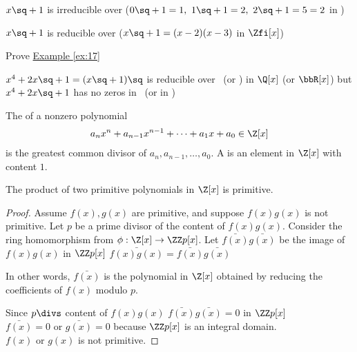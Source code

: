 \documentclass[a4paper]{article}
\begin{document}
\begin{example} \label{ex:17}
  \( x\sq + 1 \) is irreducible over \Zth \qpmi (\( 0\sq+1=1,\ 1\sq+1 = 2,\ 2\sq + 1 = 5 = 2 \) in \Zth)

  \( x\sq + 1 \) is reducible over \Zfi \qpmi (\( x\sq+1 = (x-2)(x-3) \) in \( \Zfi[x] \))
\end{example}

\begin{exercise}
  Prove \hyperref[ex:17]{Example \ref*{ex:17}}
\end{exercise}
\begin{example}
  \( x^4+2x\sq + 1 = (x\sq + 1)\sq \) is reducible over \Q\ (or \bbR) in \( \Q[x] \) (or \( \bbR[x] \)) but \( x^4+2x\sq + 1 \) has no zeros in \Q\ (or in \bbR)
\end{example}

\begin{definition}
The  of a nonzero polynomial \begin{align*}
  a_nx^n + a_{n-1}x^{n-1} + \cdots + a_1x+a_0 \in \Z[x]
\end{align*} is the greatest common divisor of \( a_n, a_{n-1}, \ldots, a_0 \).
A  is an element in \( \Z[x] \) with content \( 1 \).
\end{definition}

\begin{lemma}
  The product of two primitive polynomials in \( \Z[x] \) is primitive.
\end{lemma}

\begin{proof}
  Assume \( f(x),g(x) \) are primitive, and suppose \( f(x)g(x) \) is not primitive.
  Let \( p \) be a prime divisor of the content of \( f(x)g(x) \).
  Consider the ring homomorphism from \( \phi:\Z[x]\to \ZZ p[x] \).
  Let \( \bar{f(x)} \bar{g(x)} \) be the image of \( f(x)g(x)  \) in \( \ZZ p[x] \) \imp \( \bar{f(x)g(x)} = \bar{f(x)}\bar{g(x)} \)
  \begin{note}
    In other words, \( \bar{f(x)} \) is the polynomial in \( \Z[x] \) obtained by reducing the coefficients of \( f(x) \) modulo \( p \).
  \end{note}
  Since \( p\divs\) content of \( f(x)g(x) \) \imp \( \bar{f(x)}\bar{g(x)}=0 \) in \( \ZZ p[x] \)\\
  \imp \( \bar{f(x)} = 0 \) or \( \bar{g(x)} = 0 \) because \( \ZZ p[x] \) is an integral domain. \\
  \imp \( f(x) \) or \( g(x) \) is not primitive. \contradiction
\end{proof}
\end{document}
